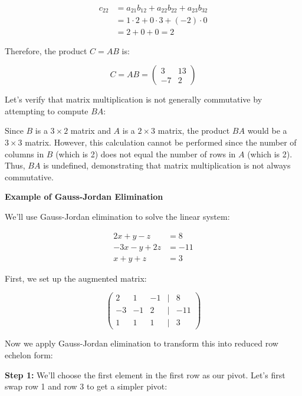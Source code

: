 \begin{align*}
    c_{22} &= a_{21}b_{12} + a_{22}b_{22} + a_{23}b_{32} \\
    &= 1 \cdot 2 + 0 \cdot 3 + (-2) \cdot 0 \\
    &= 2 + 0 + 0 = 2
\end{align*}

Therefore, the product \(C = AB\) is:

\[
    C = AB = 
    \begin{pmatrix}
    3 & 13 \\
    -7 & 2
    \end{pmatrix}
\]

Let's verify that matrix multiplication is not generally commutative by attempting to compute \(BA\):
\vspace{\baselineskip}

Since \(B\) is a \(3 \times 2\) matrix and \(A\) is a \(2 \times 3\) matrix, the product \(BA\) would be a \(3 \times 3\) matrix. However, this calculation cannot be performed since the number of columns in \(B\) (which is 2) does not equal the number of rows in \(A\) (which is 2). Thus, \(BA\) is undefined, demonstrating that matrix multiplication is not always commutative.
\vspace{\baselineskip}

\textbf{Example of Gauss-Jordan Elimination}
\vspace{\baselineskip}

We'll use Gauss-Jordan elimination to solve the linear system:

\begin{align*}
    2x + y - z &= 8 \\
    -3x - y + 2z &= -11 \\
    x + y + z &= 3
\end{align*}

First, we set up the augmented matrix:

\[
    \begin{pmatrix}
    2 & 1 & -1 & | & 8 \\
    -3 & -1 & 2 & | & -11 \\
    1 & 1 & 1 & | & 3
    \end{pmatrix}
\]

Now we apply Gauss-Jordan elimination to transform this into reduced row echelon form:
\vspace{\baselineskip}

\textbf{Step 1:} We'll choose the first element in the first row as our pivot. Let's first swap row 1 and row 3 to get a simpler pivot:

